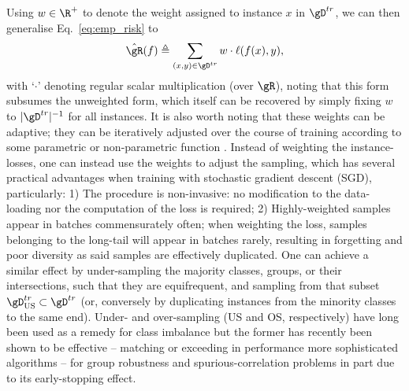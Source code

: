 Using \( w \in \R^+ \) to denote the weight assigned to instance \(x\) in \( \gD^{tr} \), we can
then generalise Eq.~\ref{eq:emp_risk} to
\begin{equation*} \label{eq:emp_risk_weighted} \hat{\gR}(f) \triangleq \sum_{(x, y) \in \gD^{tr}} w
\cdot \ell (f(x), y), \end{equation*}
with `\( \cdot \)' denoting regular scalar multiplication (over \(\gR\)), noting that this form
subsumes the unweighted form, which itself can be recovered by simply fixing \(w\) to \(
|\gD^{tr}|^{-1} \) for all instances.
%
It is also worth noting that these weights can be adaptive; they can be iteratively adjusted over
the course of training according to some parametric or non-parametric function
\citep{wang2021importance}.
%
Instead of weighting the instance-losses, one can instead use the weights to adjust the sampling,
which has several practical advantages when training with stochastic gradient descent (SGD),
particularly: 
1) The procedure is non-invasive: no modification to the data-loading nor the computation of the
loss is required;
%
2) Highly-weighted samples appear in batches commensurately often; when weighting the loss, samples
belonging to the long-tail will appear in batches rarely, resulting in forgetting and poor
diversity as said samples are effectively duplicated.
One can achieve a similar effect by under-sampling the majority classes, groups, or their
intersections, such that they are equifrequent, and \iid{} sampling from that subset \(
\gD^{tr}_{\text{US}} \subset \gD^{tr} \) (or, conversely by duplicating instances from the minority
classes to the same end).
Under- and over-sampling (US and OS, respectively) have long been used as a remedy for class
imbalance \citep{chawla2002smote} but the former has recently been shown to be effective --
matching or exceeding in performance more sophisticated algorithms -- for group robustness and
spurious-correlation problems \citep{sagawa2020investigation, idrissi2022simple} in part due to its
early-stopping effect.

